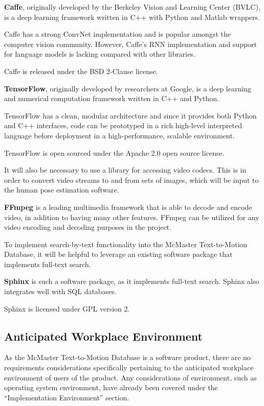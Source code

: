 \documentclass{scrreprt}
\begin{document}
\textbf{Caffe}, originally developed by the Berkeley Vision and Learning Center
(BVLC),  is a deep learning framework written in C++ with Python and Matlab
wrappers.

Caffe has a strong ConvNet implementation and is popular amongst the
computer vision community. However, Caffe's RNN implementation and support for
language models is lacking compared with other libraries.

Caffe is released under the BSD 2-Clause license.

\textbf{TensorFlow}, originally developed by researchers at Google, is a deep
learning and numerical computation framework written in C++ and Python.

TensorFlow has a clean, modular architecture and since it provides both Python
and C++ interfaces, code can be prototyped in a rich high-level interpreted
language before deployment in a high-performance, scalable environment.

TensorFlow is open sourced under the Apache 2.0 open source license.

It will also be necessary to use a library for accessing video codecs. This is
in order to convert video streams to and from sets of images, which will be
input to the human pose estimation software.

\textbf{FFmpeg} is a leading multimedia framework that is able to decode and
encode video, in addition to having many other features. FFmpeg can be utilized
for any video encoding and decoding purposes in the project.

To implement search-by-text functionality into the McMaster Text-to-Motion
Database, it will be helpful to leverage an existing software package that
implements full-text search.

\textbf{Sphinx} is such a software package, as it implements full-text search.
Sphinx also integrates well with SQL databases.

Sphinx is licensed under GPL version 2.

\subsection{Anticipated Workplace Environment}

As the McMaster Text-to-Motion Database is a software product, there are no
requirements considerations specifically pertaining to the anticipated
workplace environment of users of the product. Any considerations of
environment, such as operating system environment, have already been covered
under the ``Implementation Environment'' section.
\end{document}
